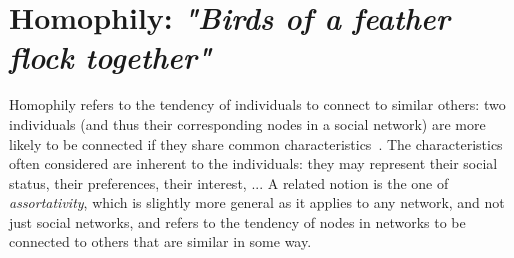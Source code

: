 \section{Homophily: \emph{"Birds of a feather flock together"}}
\label{sec:homophily}

Homophily refers to the tendency of individuals to connect to similar others: two individuals (and thus their corresponding nodes in a social network) are more likely to be connected if they share common characteristics~\cite{mcpherson2001birds,lazarsfeld1954friendship}. The characteristics often considered are inherent to the individuals: they may represent their social status, their preferences, their interest, ... A related notion is the one of {\it assortativity}, which is slightly more general as it applies to any network, and not just social networks, and refers to the tendency of nodes in networks to be connected to others that are similar in some way.

